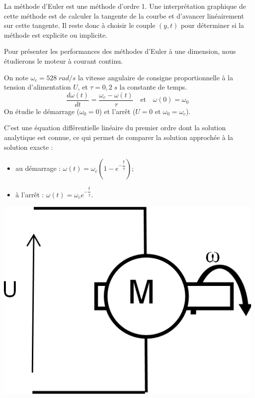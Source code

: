 \documentclass[10pt]{article}
\begin{document}
La méthode d’Euler est une méthode d’ordre 1. Une interprétation graphique de cette méthode est de calculer la tangente de la courbe et d’avancer linéairement sur cette tangente. Il reste donc à choisir le couple $(y,t)$ pour déterminer si la méthode est explicite ou implicite.

Pour présenter les performances des méthodes d’Euler à une dimension, nous étudierons le moteur à courant continu.

\begin{minipage}[c]{.65\linewidth}
On note $\omega_c = 528\; rad/s$ la vitesse angulaire de consigne proportionnelle à la tension d'alimentation $U$, et $\tau=0,2\; s$ la constante de temps.
$$ \dfrac{d\omega(t)}{dt} = \dfrac{\omega_c-\omega(t)}{\tau} \quad \text{et} \quad \omega(0)=\omega_0
$$
On étudie le démarrage ($\omega_0=0$) et l'arrêt ($U=0$ et $\omega_0=\omega_c$).

C’est une équation différentielle linéaire du premier ordre dont la solution analytique est connue, ce qui permet de comparer la solution approchée à la solution exacte :
\begin{itemize}
\item au démarrage : $\omega(t)=\omega_c\left(1-e^{-\dfrac{t}{\tau}}\right)$;
\item à l'arrêt : $\omega(t)=\omega_c e^{-\dfrac{t}{\tau}}$.
\end{itemize}


\end{minipage} \hfill
\begin{minipage}[c]{.3\linewidth}
\begin{center}
\includegraphics[width=.95\textwidth]{images/fig_01}
\end{center}
\end{minipage}
\end{document}

